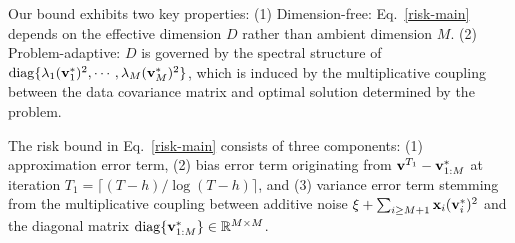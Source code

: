 \begin{theorem}
\end{theorem}
Our bound exhibits two key properties: (1) Dimension-free: Eq.~\eqref{risk-main} depends on the effective dimension $D$ rather than ambient dimension $M$. (2) Problem-adaptive: $D$ is governed by the spectral structure of $\operatorname*{diag}\{\lambda_1(\mathbf{v}_1^*)^2,\cdots,\lambda_M(\mathbf{v}_M^*)^2\}$, which is induced by the multiplicative coupling between the data covariance matrix and optimal solution determined by the problem. 

The risk bound in Eq.~\eqref{risk-main} consists of three components: (1) approximation error term, (2) bias error term originating from $\mathbf{v}^{T_1}-\mathbf{v}_{1:M}^*$ at iteration $T_1=\lceil(T-h)/\log(T-h)\rceil$, and (3) variance error term stemming from the multiplicative coupling between additive noise $\xi+\sum_{i\geq M+1}\mathbf{x}_i(\mathbf{v}_i^*)^2$ and the diagonal matrix $\operatorname*{diag}\{\mathbf{v}_{1:M}^*\}\in\mathbb{R}^{M\times M}$. 

